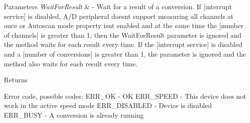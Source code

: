 \begin{DoxyParams}{Parameters}
{\em Wait\+For\+Result} & -\/ Wait for a result of a conversion. If \mbox{[}interrupt service\mbox{]} is disabled, A/D peripheral doesn\textquotesingle{}t support measuring all channels at once or Autoscan mode property isn\textquotesingle{}t enabled and at the same time the \mbox{[}number of channels\mbox{]} is greater than 1, then the Wait\+For\+Result parameter is ignored and the method waits for each result every time. If the \mbox{[}interrupt service\mbox{]} is disabled and a \mbox{[}number of conversions\mbox{]} is greater than 1, the parameter is ignored and the method also waits for each result every time. \\
\hline
\end{DoxyParams}
\begin{DoxyReturn}{Returns}

\begin{DoxyItemize}
\item Error code, possible codes\+: E\+R\+R\+\_\+\+OK -\/ OK E\+R\+R\+\_\+\+S\+P\+E\+ED -\/ This device does not work in the active speed mode E\+R\+R\+\_\+\+D\+I\+S\+A\+B\+L\+ED -\/ Device is disabled E\+R\+R\+\_\+\+B\+U\+SY -\/ A conversion is already running 
\end{DoxyItemize}
\end{DoxyReturn}

